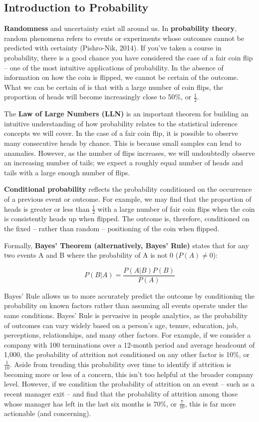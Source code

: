 \documentclass[]{book}
\begin{document}
\hypertarget{introduction-to-probability}{%
\subsection{Introduction to Probability}\label{introduction-to-probability}}

\textbf{Randomness} and uncertainty exist all around us. In \textbf{probability theory}, random phenomena refers to events or experiments whose outcomes cannot be predicted with certainty (Pishro-Nik, 2014). If you've taken a course in probability, there is a good chance you have considered the case of a fair coin flip -- one of the most intuitive applications of probability. In the absence of information on how the coin is flipped, we cannot be certain of the outcome. What we can be certain of is that with a large number of coin flips, the proportion of heads will become increasingly close to 50\%, or \(\frac{1}{2}\).

The \textbf{Law of Large Numbers (LLN)} is an important theorem for building an intuitive understanding of how probability relates to the statistical inference concepts we will cover. In the case of a fair coin flip, it is possible to observe many consecutive heads by chance. This is because small samples can lend to anamalies. However, as the number of flips increases, we will undoubtedly observe an increasing number of tails; we expect a roughly equal number of heads and tails with a large enough number of flips.

\textbf{Conditional probability} reflects the probability conditioned on the occurrence of a previous event or outcome. For example, we may find that the proportion of heads is greater or less than \(\frac{1}{2}\) with a large number of fair coin flips when the coin is consistently heads up when flipped. The outcome is, therefore, conditioned on the fixed -- rather than random -- positioning of the coin when flipped.

Formally, \textbf{Bayes' Theorem (alternatively, Bayes' Rule)} states that for any two events A and B where the probability of A is not 0 (\(P(A) \neq 0\)):

\[ P(B \vert A) = \frac{P(A \vert B) P(B)}{P(A)} \]

Bayes' Rule allows us to more accurately predict the outcome by conditioning the probability on known factors rather than assuming all events operate under the same conditions. Bayes' Rule is pervasive in people analytics, as the probability of outcomes can vary widely based on a person's age, tenure, education, job, perceptions, relationships, and many other factors. For example, if we consider a company with 100 terminations over a 12-month period and average headcount of 1,000, the probability of attrition not conditioned on any other factor is 10\%, or \(\frac{1}{10}\). Aside from trending this probability over time to identify if attrition is becoming more or less of a concern, this isn't too helpful at the broader company level. However, if we condition the probability of attrition on an event -- such as a recent manager exit -- and find that the probability of attrition among those whose manager has left in the last six months is 70\%, or \(\frac{7}{10}\), this is far more actionable (and concerning).
\end{document}
